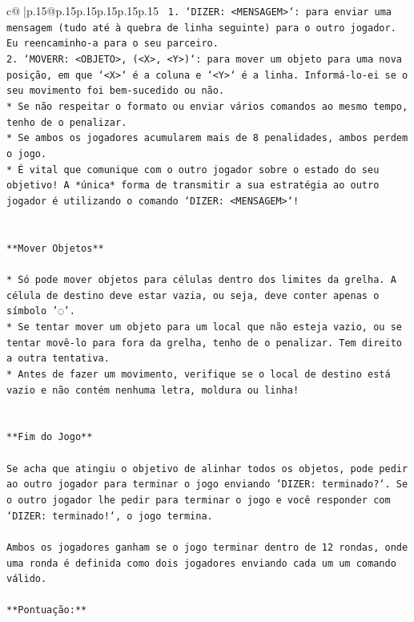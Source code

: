 \documentclass{article}
\begin{document}
{\begin{supertabular}{c@{$\;$}|p{.15\linewidth}@{}p{.15\linewidth}p{.15\linewidth}p{.15\linewidth}p{.15\linewidth}p{.15\linewidth}}
{{{\texttt{ 1. `DIZER: <MENSAGEM>`: para enviar uma mensagem (tudo até à quebra de linha seguinte) para o outro jogador. Eu reencaminho{-}a para o seu parceiro.} \\
\texttt{2. `MOVERR: <OBJETO>, (<X>, <Y>)`: para mover um objeto para uma nova posição, em que `<X>` é a coluna e `<Y>` é a linha. Informá{-}lo{-}ei se o seu movimento foi bem{-}sucedido ou não.} \\
\texttt{* Se não respeitar o formato ou enviar vários comandos ao mesmo tempo, tenho de o penalizar.} \\
\texttt{* Se ambos os jogadores acumularem mais de 8 penalidades, ambos perdem o jogo.} \\
\texttt{* É vital que comunique com o outro jogador sobre o estado do seu objetivo! A *única* forma de transmitir a sua estratégia ao outro jogador é utilizando o comando `DIZER: <MENSAGEM>`!} \\
\\ 
\\ 
\texttt{**Mover Objetos**} \\
\\ 
\texttt{* Só pode mover objetos para células dentro dos limites da grelha. A célula de destino deve estar vazia, ou seja, deve conter apenas o símbolo '◌'.} \\
\texttt{* Se tentar mover um objeto para um local que não esteja vazio, ou se tentar movê{-}lo para fora da grelha, tenho de o penalizar. Tem direito a outra tentativa.} \\
\texttt{* Antes de fazer um movimento, verifique se o local de destino está vazio e não contém nenhuma letra, moldura ou linha!} \\
\\ 
\\ 
\texttt{**Fim do Jogo**} \\
\\ 
\texttt{Se acha que atingiu o objetivo de alinhar todos os objetos, pode pedir ao outro jogador para terminar o jogo enviando `DIZER: terminado?`. Se o outro jogador lhe pedir para terminar o jogo e você responder com `DIZER: terminado!`, o jogo termina.} \\
\\ 
\texttt{Ambos os jogadores ganham se o jogo terminar dentro de 12 rondas, onde uma ronda é definida como dois jogadores enviando cada um um comando válido.} \\
\\ 
\texttt{**Pontuação:**} \\
\\ 
}}}
\end{supertabular}}
\end{document}
